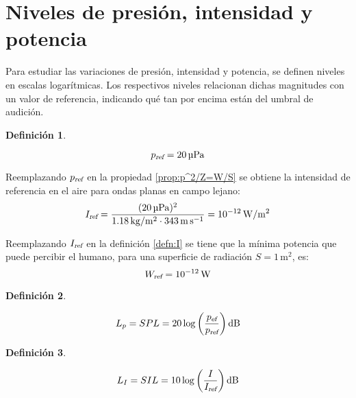 \documentclass[a5paper,12pt,twoside]{book}
\newtheorem{defn}{{Definición}}[chapter]
\begin{document}
\section{Niveles de presión, intensidad y potencia}

Para estudiar las variaciones de presión, intensidad y potencia, se definen niveles en escalas logarítmicas. Los respectivos niveles relacionan dichas magnitudes con un valor de referencia, indicando qué tan por encima están del umbral de audición.

\begin{mdframed}[style=MyFrame1]
    \begin{defn}
    \end{defn}
    \begin{equation*}
        {{p}_\textsl{{ref}}} = 20\,\si{\micro\pascal}
    \end{equation*}
\end{mdframed}

Reemplazando ${{p}_\textsl{{ref}}}$ en la propiedad \ref{prop:p^2/Z=W/S} se obtiene la intensidad de referencia en el aire para ondas planas en campo lejano:
\begin{equation*}
    {{I}_\textsl{{ref}}}=\frac{(20\,\si{\micro\pascal})^2}{1.18\,\si{\kilo\gram\per\metre^2} \cdot 343\,\si{\metre\per\second}} = 10^{-12}\,\si{\watt\per\metre^2}
\end{equation*}

Reemplazando ${{I}_\textsl{{ref}}}$ en la definición \ref{defn:I} se tiene que la mínima potencia que puede percibir el humano, para una superficie de radiación $S=1\,\si{\metre^2}$, es:
\begin{equation*}
    {{W}_\textsl{{ref}}} = 10^{-12}\,\si{\watt}
\end{equation*}

\begin{mdframed}[style=MyFrame1]
    \begin{defn}
        \label{defn:SPL}
    \end{defn}
    \begin{equation*}
        L_p = SPL = 20 \log \left( \frac{\rms{p}}{\sub{p}{ref}} \right) \si{\deci\bel}
    \end{equation*}
\end{mdframed}

\begin{mdframed}[style=MyFrame1]
    \begin{defn}
        \label{defn:SIL}
    \end{defn}
    \begin{equation*}
        L_I = SIL = 10 \log \left( \frac{I}{\sub{I}{ref}} \right)\si{\deci\bel}
    \end{equation*}
\end{mdframed}
\end{document}
